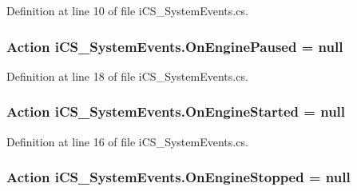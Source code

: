 Definition at line 10 of file i\+C\+S\+\_\+\+System\+Events.\+cs.

\hypertarget{classi_c_s___system_events_a2e411329cc28135ecadddb797d5dfc3d}{
\subsubsection[{On\+Engine\+Paused}]{\setlength{\rightskip}{0pt plus 5cm}Action i\+C\+S\+\_\+\+System\+Events.\+On\+Engine\+Paused = null\hspace{0.3cm}{\ttfamily [static]}}}\label{classi_c_s___system_events_a2e411329cc28135ecadddb797d5dfc3d}


Definition at line 18 of file i\+C\+S\+\_\+\+System\+Events.\+cs.

\hypertarget{classi_c_s___system_events_a02a666dba32b8af96dcc2e90a5c2c18c}{
\subsubsection[{On\+Engine\+Started}]{\setlength{\rightskip}{0pt plus 5cm}Action i\+C\+S\+\_\+\+System\+Events.\+On\+Engine\+Started = null\hspace{0.3cm}{\ttfamily [static]}}}\label{classi_c_s___system_events_a02a666dba32b8af96dcc2e90a5c2c18c}


Definition at line 16 of file i\+C\+S\+\_\+\+System\+Events.\+cs.

\hypertarget{classi_c_s___system_events_a34cb873cbf1d19e166503cd8a302bef9}{
\subsubsection[{On\+Engine\+Stopped}]{\setlength{\rightskip}{0pt plus 5cm}Action i\+C\+S\+\_\+\+System\+Events.\+On\+Engine\+Stopped = null\hspace{0.3cm}{\ttfamily [static]}}}\label{classi_c_s___system_events_a34cb873cbf1d19e166503cd8a302bef9}


